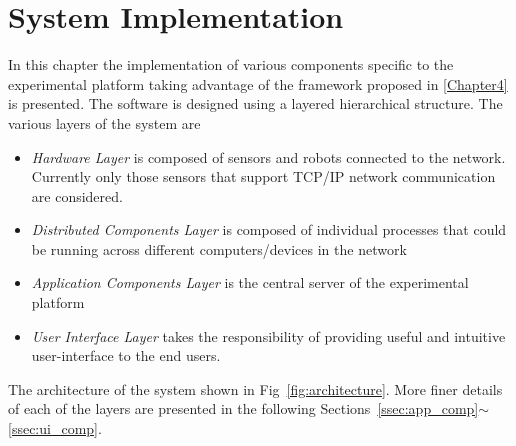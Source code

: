 
\chapter{System Implementation} %

\label{Chapter5} %

In this chapter the implementation of various components specific to the experimental platform taking advantage of the framework proposed in \ref{Chapter4} is presented. The software is designed using a layered hierarchical structure. The various layers of the system are
\begin{itemize}
\item \emph{Hardware Layer} is composed of sensors and robots connected to the network. Currently only those sensors that support TCP/IP network communication are considered.
\item \emph{Distributed Components Layer} is composed of individual processes that could be running across different computers/devices in the network
\item \emph{Application Components Layer} is the central server of the experimental platform
\item \emph{User Interface Layer} takes the responsibility of providing useful and intuitive user-interface to the end users.
\end{itemize}
The architecture of the system shown in Fig~\ref{fig:architecture}. More finer details of each of the layers are presented in the following Sections~\ref{ssec:app_comp}$\sim$\ref{ssec:ui_comp}.
